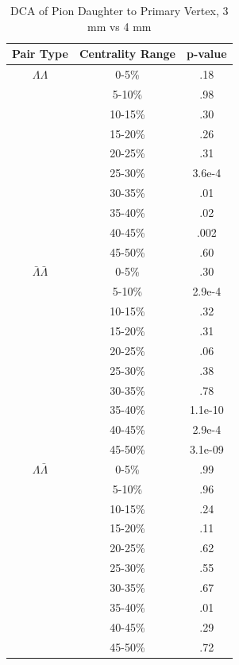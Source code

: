 \begin{table}
\begin{minipage}{18pc}
\caption {DCA of Pion Daughter to Primary Vertex, 3 mm vs 4 mm} \label{tab:DcaPionPvalueTests3mmVs4mm}
\begin{center}
\begin{tabular}{| c | c | c |}
  \hline                       
  Pair Type & Centrality Range & p-value \\
  \hline
  $\Lambda\Lambda$ & 0-5\% & .18 \\
   & 5-10\%  & .98 \\
   & 10-15\% & .30 \\
   & 15-20\% & .26 \\
   & 20-25\% & .31 \\
   & 25-30\% & 3.6e-4 \\
   & 30-35\% & .01 \\
   & 35-40\% & .02 \\
   & 40-45\% & .002 \\
   & 45-50\% & .60 \\
   \hline
  $\bar{\Lambda}\bar{\Lambda}$ &  0-5\% & .30 \\
   & 5-10\% & 2.9e-4 \\
   & 10-15\% & .32 \\
   & 15-20\% & .31 \\
   & 20-25\% & .06 \\
   & 25-30\% & .38 \\
   & 30-35\% & .78 \\
   & 35-40\% & 1.1e-10 \\
   & 40-45\% & 2.9e-4 \\
   & 45-50\% & 3.1e-09 \\
   \hline
  $\Lambda\bar{\Lambda}$ &  0-5\% & .99 \\
   & 5-10\% & .96 \\
   & 10-15\% & .24 \\
   & 15-20\% & .11 \\
   & 20-25\% & .62 \\
   & 25-30\% & .55 \\
   & 30-35\% & .67 \\
   & 35-40\% & .01 \\
   & 40-45\% & .29 \\
   & 45-50\% & .72 \\
  \hline  
\end{tabular}
\end{center}
\end{minipage}
\end{table}




